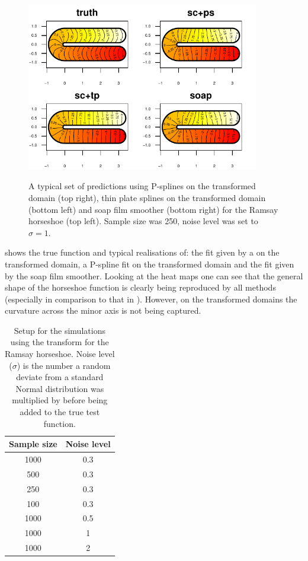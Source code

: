 \begin{figure}
\centering
\includegraphics[width=4in]{sc/figs/compsmooth.pdf} \\
\caption{A typical set of predictions using P-splines on the transformed domain (top right), thin plate splines on the transformed domain (bottom left) and soap film smoother (bottom right) for the Ramsay horseshoe (top left). Sample size was 250, noise level was set to $\sigma=1$.}
\label{compsmooth}
\end{figure}

 shows the true function and typical realisations of: the fit given by a \tprs on the transformed domain, a P-spline fit on the transformed domain and the fit given by the soap film smoother. Looking at the heat maps one can see that the general shape of the horseshoe function is clearly being reproduced by all methods (especially in comparison to that in ). However, on the transformed domains the curvature across the minor axis is not being captured.

\begin{table}[tb]
\begin{tabular}{c c}\\
Sample size & Noise level \\
\hline
\hline
1000 & 0.3 \\
500 & 0.3 \\
250 & 0.3 \\
100 & 0.3 \\
1000 & 0.5 \\
1000 & 1 \\
1000 & 2 \\
\end{tabular}
\caption{Setup for the simulations using the \sch transform for the Ramsay horseshoe. Noise level ($\sigma$) is the number a random deviate from a standard Normal distribution was multiplied by before being added to the true test function.}
\label{scramsimtable}
\end{table}

